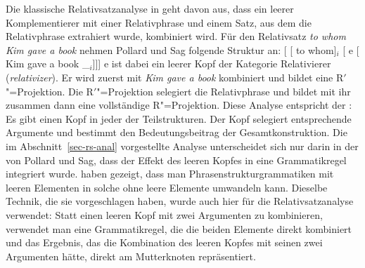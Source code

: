 Die klassische Relativsatzanalyse in  geht davon aus, dass ein leerer
Komplementierer mit einer Relativphrase und einem Satz, aus dem die Relativphrase extrahiert wurde,
kombiniert wird. Für den Relativsatz \emph{to whom Kim gave a book} nehmen Pollard und Sag folgende Struktur an:
\ea
{}[ [ to whom]$_i$ [ e [ Kim gave a book \_$_i$]]]
\z
e ist dabei ein leerer Kopf der Kategorie Relativierer (\emph{relativizer}). Er wird zuerst mit
\emph{Kim gave a book} kombiniert und bildet eine R$'$"=Projektion. Die R$'$"=Projektion selegiert die
Relativphrase und bildet mit ihr zusammen dann eine vollständige R"=Projektion. Diese Analyse
entspricht der \xbart: Es gibt einen Kopf in jeder 
der Teilstrukturen. Der Kopf selegiert entsprechende Argumente und bestimmt den Bedeutungsbeitrag
der Gesamtkonstruktion. Die im Abschnitt~\ref{sec-rs-anal} vorgestellte Analyse unterscheidet sich
nur darin in der von Pollard und Sag, dass der Effekt des leeren Kopfes in eine Grammatikregel
integriert wurde. \citet*[, Lemma~4.1]{BHPS61a} haben gezeigt, dass man
Phrasenstrukturgrammatiken mit leeren Elementen in solche ohne leere Elemente umwandeln
kann. Dieselbe Technik, die sie vorgeschlagen haben, wurde auch hier für die Relativsatzanalyse
verwendet: Statt einen leeren Kopf mit zwei Argumenten zu kombinieren, verwendet man eine
Grammatikregel, die die beiden Elemente direkt kombiniert und das Ergebnis, das die Kombination des
leeren Kopfes mit seinen zwei Argumenten hätte, direkt am Mutterknoten repräsentiert.

